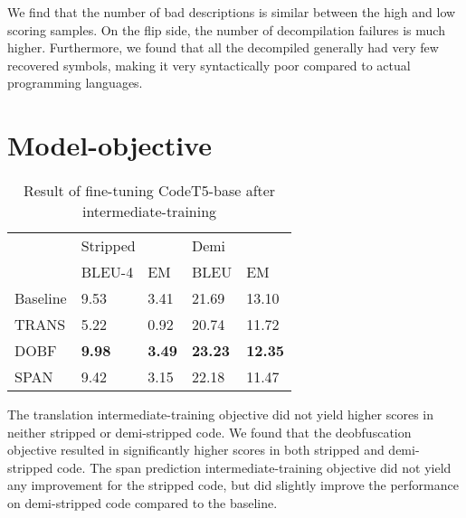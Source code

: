 We find that the number of bad descriptions is similar between the high and low scoring samples. On the flip side, the number of decompilation failures is much higher.
Furthermore, we found that all the decompiled generally had very few recovered symbols, making it very syntactically poor compared to actual programming languages.


\section{Model-objective}

\label{tab:intermediate}
\begin{table}[!h]
\centering
\begin{tabular}{lll|ll}
\rowcolor[HTML]{C0C0C0} 
                               & \multicolumn{2}{l|}{\cellcolor[HTML]{C0C0C0}Stripped} & Demi           &       \\ \cline{2-5} 
\multicolumn{1}{l|}{\textbf{}} & BLEU-4                    & EM                        & BLEU           & EM    \\ \hline
\multicolumn{1}{l|}{Baseline}  & 9.53                      & 3.41                      & 21.69          & 13.10 \\
\multicolumn{1}{l|}{TRANS}     & 5.22                      & 0.92                      & 20.74          & 11.72 \\
\multicolumn{1}{l|}{DOBF}      & \textbf{9.98}             & \textbf{3.49}             & \textbf{23.23} & \textbf{12.35}   \\
\multicolumn{1}{l|}{SPAN}      & 9.42                      & 3.15                      & 22.18          & 11.47
\end{tabular}
\caption{Result of fine-tuning CodeT5-base after intermediate-training}
\end{table}

The translation intermediate-training objective did not yield higher scores in neither stripped or demi-stripped code. We found that the deobfuscation objective resulted in significantly higher scores in both stripped and demi-stripped code. The span prediction intermediate-training objective did not yield any improvement for the stripped code, but did slightly improve the performance on demi-stripped code compared to the baseline.